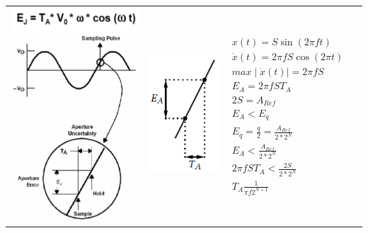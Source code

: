 \begin{longtable}[c]{ l  l l l }


\begin{minipage}{4cm}

  \includegraphics[scale=0.45]{pictures/aperturfehlercos}

\end{minipage}
&
\begin{minipage}{3cm}

  \includegraphics[scale=0.5]{pictures/aperturfehler}
\end{minipage}
&
\begin{minipage}{5cm}
\begin{gather}
x(t)=S\sin(2\pi ft)\\
\dot{x}(t)=2\pi fS\cos(2\pi t)\\
max\mid\dot{x}(t)\mid= 2\pi fS \\
E_{A}=2\pi fST_{A}\\
2S=A_{Ref}\\
E_{A}<E_{q}\\
E_{q}=\frac{q}{2}=\frac{A_{Ref}}{2*2^N}\\
E_{A}<\frac{A_{Ref}}{2*2^N}\\
2\pi fST_{A} <\frac{2S}{2*2^N}\\
T_{A}\frac{1}{\pi f2^{N+1}}
\end{gather}




\end{minipage}
\end{longtable}
